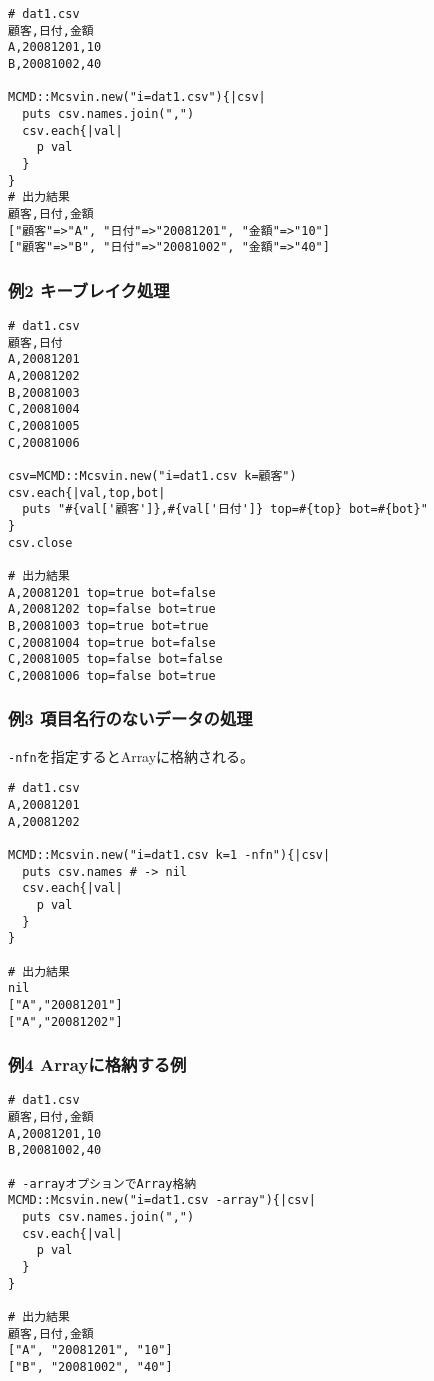 \begin{Verbatim}[baselinestretch=0.7,frame=single]
# dat1.csv
顧客,日付,金額
A,20081201,10
B,20081002,40

MCMD::Mcsvin.new("i=dat1.csv"){|csv|
  puts csv.names.join(",")
  csv.each{|val|
    p val
  }
}
# 出力結果
顧客,日付,金額
["顧客"=>"A", "日付"=>"20081201", "金額"=>"10"]
["顧客"=>"B", "日付"=>"20081002", "金額"=>"40"]
\end{Verbatim}

\subsubsection*{例2 キーブレイク処理}

\begin{Verbatim}[baselinestretch=0.7,frame=single]
# dat1.csv
顧客,日付
A,20081201
A,20081202
B,20081003
C,20081004
C,20081005
C,20081006

csv=MCMD::Mcsvin.new("i=dat1.csv k=顧客")
csv.each{|val,top,bot|
  puts "#{val['顧客']},#{val['日付']} top=#{top} bot=#{bot}"
}
csv.close

# 出力結果
A,20081201 top=true bot=false
A,20081202 top=false bot=true
B,20081003 top=true bot=true
C,20081004 top=true bot=false
C,20081005 top=false bot=false
C,20081006 top=false bot=true
\end{Verbatim}

\subsubsection*{例3 項目名行のないデータの処理}
\verb|-nfn|を指定するとArrayに格納される。
\begin{Verbatim}[baselinestretch=0.7,frame=single]
# dat1.csv
A,20081201
A,20081202

MCMD::Mcsvin.new("i=dat1.csv k=1 -nfn"){|csv|
  puts csv.names # -> nil
  csv.each{|val|
    p val
  }
}

# 出力結果
nil
["A","20081201"]
["A","20081202"]
\end{Verbatim}

\subsubsection*{例4 Arrayに格納する例}

\begin{Verbatim}[baselinestretch=0.7,frame=single]
# dat1.csv
顧客,日付,金額
A,20081201,10
B,20081002,40

# -arrayオプションでArray格納
MCMD::Mcsvin.new("i=dat1.csv -array"){|csv|
  puts csv.names.join(",")
  csv.each{|val|
    p val
  }
}

# 出力結果
顧客,日付,金額
["A", "20081201", "10"]
["B", "20081002", "40"]
\end{Verbatim}

